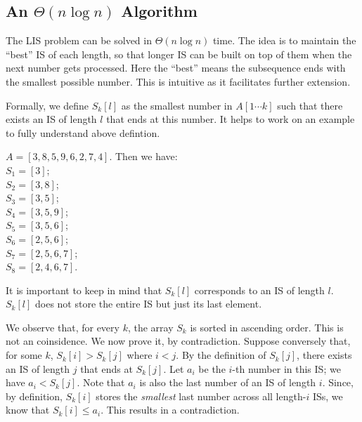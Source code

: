 

\subsection*{An $\Theta(n\log n)$ Algorithm}

The LIS problem can be solved in $\Theta(n\log n)$ time.
The idea is to maintain the ``best'' IS of each length, so that
longer IS can be built on top of them when the next number gets processed.
Here the ``best'' means the subsequence ends with the smallest possible number.
This is intuitive as it facilitates further extension.

Formally, we define $S_k[l]$ as the smallest number in $A[1\cdots k]$ such
that there exists an IS of length $l$ that ends at this number.
It helps to work on an example to fully understand above defintion.

$A = [3, 8, 5, 9, 6, 2, 7, 4]$. Then we have:\\
$S_1 = [3]$; \\
$S_2 = [3, 8]$; \\
$S_3 = [3, 5]$; \\
$S_4 = [3, 5, 9]$; \\
$S_5 = [3, 5, 6]$; \\
$S_6 = [2, 5, 6]$; \\
$S_7 = [2, 5, 6, 7]$; \\
$S_8 = [2, 4, 6, 7]$.

It is important to keep in mind that $S_k[l]$ corresponds to an IS of length $l$.
$S_k[l]$ does not store the entire IS but just its last element.

We observe that, for every $k$, the array $S_k$ is sorted in ascending order.
This is not an coinsidence. We now prove it, by contradiction.
Suppose conversely that, for some $k$, $S_k[i] > S_k[j]$ where $i < j$.
By the definition of $S_k[j]$, there exists an IS
of length $j$ that ends at $S_k[j]$. Let $a_i$ be the $i$-th number
in this IS; we have $a_i < S_k[j]$.
Note that $a_i$ is also the last number of an IS of length $i$.
Since, by definition, $S_k[i]$ stores the \emph{smallest}
last number across all length-$i$ ISs,
we know that $S_k[i] \le a_i$. This results in a contradiction.

